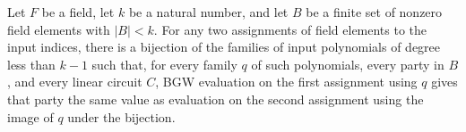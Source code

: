 \begin{theorem}
\label{TCSlib.MPC.BGW.linear_perfectPrivacy}
\leanok
{}
Let $F$ be a field, let $k$ be a natural number, and let $B$ be a finite set of nonzero
field elements with $|B|<k$. For any two assignments of field elements to the input
indices, there is a bijection of the families of input polynomials of degree less than
$k-1$ such that, for every family $q$ of such polynomials, every party in $B$, and every
linear circuit $C$, BGW evaluation on the first assignment using $q$ gives that party
the same value as evaluation on the second assignment using the image of $q$ under the
bijection.
\end{theorem}
